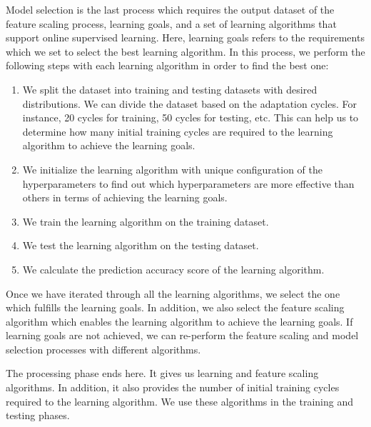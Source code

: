\documentclass[a4paper,12pt]{article}
\begin{document}
Model selection is the last process which requires the output dataset of the feature scaling process, learning goals, and a set of learning algorithms that support online supervised learning. Here, learning goals refers to the requirements which we set to select the best learning algorithm. In this process, we perform the following steps with each learning algorithm in order to find the best one:
\begin{enumerate}
	\item We split the dataset into training and testing datasets with desired distributions. We can divide the dataset based on the adaptation cycles. For instance, 20 cycles for training, 50 cycles for testing, etc. This can help us to determine how many initial training cycles are required to the learning algorithm to achieve the learning goals.
	\item We initialize the learning algorithm with unique configuration of the hyperparameters to find out which hyperparameters are more effective than others in terms of achieving the learning goals.
	\item We train the learning algorithm on the training dataset.
	\item We test the learning algorithm on the testing dataset.
	\item We calculate the prediction accuracy score of the learning algorithm.  
\end{enumerate}
Once we have iterated through all the learning algorithms, we select the one which fulfills the learning goals. In addition, we also select the feature scaling algorithm which enables the learning algorithm to achieve the learning goals. If learning goals are not achieved, we can re-perform the feature scaling and model selection processes with different algorithms.

The processing phase ends here. It gives us learning and feature scaling algorithms. In addition, it also provides the number of initial training cycles required to the learning algorithm. We use these algorithms in the training and testing phases.
\end{document}
